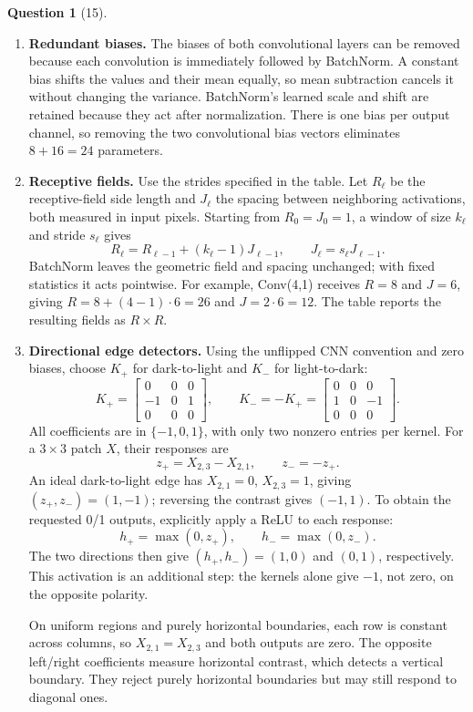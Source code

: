 \documentclass[12pt]{article}
\theoremstyle{definition}
\newtheorem{exercise}{Question}%
\begin{document}
\begin{exercise}[15]
{\begin{enumerate}
Flattening gives $4\cdot4\cdot16=256$ features, so FC has
$(256+1)\cdot10=2570$ parameters. The table displays Reshape and FC vectors
as $(1,1,D)$, not spatial feature maps. The total is $4178$ trainable parameters.
\item \textbf{Redundant biases.}
The biases of both convolutional layers can be removed because each
convolution is immediately followed by BatchNorm. A constant bias shifts
the values and their mean equally, so mean subtraction cancels it without
changing the variance. BatchNorm's learned scale and shift are retained
because they act after normalization. There is one bias per output
channel, so removing the two convolutional bias vectors eliminates
$8+16=24$ parameters.
\item \textbf{Receptive fields.}
Use the strides specified in the table. Let $R_\ell$ be the receptive-field
side length and $J_\ell$ the spacing between neighboring activations,
both measured in input pixels. Starting from $R_0=J_0=1$, a window of
size $k_\ell$ and stride $s_\ell$ gives
\[
R_\ell=R_{\ell-1}+(k_\ell-1)J_{\ell-1},\qquad
J_\ell=s_\ell J_{\ell-1}.
\]
BatchNorm leaves the geometric field and spacing unchanged; with fixed
statistics it acts pointwise. For example, Conv(4,1) receives $R=8$ and
$J=6$, giving $R=8+(4-1)\cdot6=26$ and $J=2\cdot6=12$.
The table reports the resulting fields as $R\times R$.
\item \textbf{Directional edge detectors.}
Using the unflipped CNN convention and zero biases, choose $K_+$ for
dark-to-light and $K_-$ for light-to-dark:
\[
K_+=\begin{bmatrix}
0&0&0\\
-1&0&1\\
0&0&0
\end{bmatrix},\qquad
K_-=-K_+=\begin{bmatrix}
0&0&0\\
1&0&-1\\
0&0&0
\end{bmatrix}.
\]
All coefficients are in $\{-1,0,1\}$, with only two nonzero entries per
kernel. For a $3\times3$ patch $X$, their responses are
\[
z_+=X_{2,3}-X_{2,1},\qquad z_-=-z_+.
\]
An ideal dark-to-light edge has $X_{2,1}=0$, $X_{2,3}=1$, giving
$(z_+,z_-)=(1,-1)$; reversing the contrast gives $(-1,1)$.
To obtain the requested 0/1 outputs, explicitly apply a ReLU to each
response:
\[
h_+=\max(0,z_+),\qquad h_-=\max(0,z_-).
\]
The two directions then give $(h_+,h_-)=(1,0)$ and $(0,1)$, respectively.
This activation is an additional step: the kernels alone give $-1$,
not zero, on the opposite polarity.

On uniform regions and purely horizontal boundaries, each row is
constant across columns, so $X_{2,1}=X_{2,3}$ and both outputs are zero.
The opposite left/right coefficients measure horizontal contrast,
which detects a vertical boundary. They reject purely horizontal
boundaries but may still respond to diagonal ones.
\end{enumerate}
}

\end{exercise}
\end{document}
